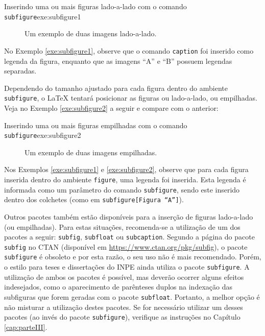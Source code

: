 \begin{texexptitled}[breakable,enhanced,middle=2mm]{Inserindo uma ou mais figuras lado-a-lado com o comando {\tt subfigure}}{exe:subfigure1}
\begin{figure}[H]
    \begin{center}
        \caption{Um exemplo de duas imagens lado-a-lado.}
    \end{center}
\end{figure}
\end{texexptitled}

No Exemplo \ref{exe:subfigure1}, observe que o comando \texttt{caption} foi inserido como legenda da figura, enquanto que as imagens ``A'' e ``B'' possuem legendas separadas.

Dependendo do tamanho ajustado para cada figura dentro do ambiente {\tt subfigure}, o \LaTeX{} tentará posicionar as figuras ou lado-a-lado, ou empilhadas. Veja no Exemplo \ref{exe:subfigure2} a seguir e compare com o anterior:

\begin{texexptitled}[breakable,enhanced,middle=2mm]{Inserindo uma ou mais figuras empilhadas com o comando {\tt subfigure}}{exe:subfigure2}
\begin{figure}[H]
    \begin{center}
        \caption{Um exemplo de duas imagens empilhadas.}
    \end{center}
\end{figure}
\end{texexptitled}

Nos Exemplos \ref{exe:subfigure1} e \ref{exe:subfigure2}, observe que para cada figura inserida dentro do ambiente {\tt figure}, uma legenda foi inserida. Esta legenda é informada como um parâmetro do comando {\tt subfigure}, sendo este inserido dentro dos colchetes (como em {\tt subfigure[Figura ``A'']}). 

Outros pacotes também estão disponíveis para a inserção de figuras lado-a-lado (ou empilhadas). Para estas situações, recomenda-se a utilização de um dos pacotes a seguir: {\tt subfig}, {\tt subfloat} ou {\tt subcaption}. Segundo a página do pacote {\tt subfig} no CTAN (disponível em \url{https://www.ctan.org/pkg/subfig}), o pacote {\tt subfigure} é obsoleto e por esta razão, o seu uso não é mais recomendado. Porém, o estilo para teses e dissertações do INPE ainda utiliza o pacote {\tt subfigure}. A utilização de ambos os pacotes é possível, mas deverão ocorrer alguns efeitos indesejados, como o aparecimento de parênteses duplos na indexação das subfiguras que forem geradas com o pacote {\tt subfloat}. Portanto, a melhor opção é não misturar a utilização destes pacotes. Se for necessário utilizar um desses pacotes (ao invés do pacote {\tt subfigure}), verifique as instruções no Capítulo \ref{cap:parteIII}. 


